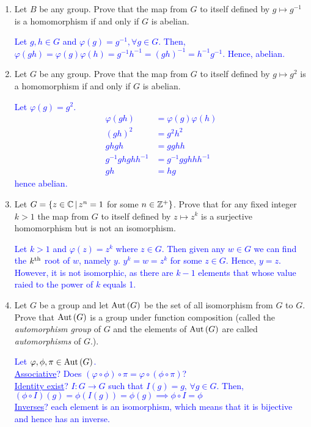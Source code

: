 \documentclass[10pt,a4paper]{report}
\newcommand{\BLUE}[1]{\textcolor{blue}{#1}}
\begin{document}
\begin{enumerate}
	\item Let $B$ be any group.  Prove that the map from $G$ to itself defined by $g \mapsto g^{-1}$ is a homomorphism if and only if $G$ is abelian.
	
	\BLUE{Let $g,h \in G$ and $\varphi(g)= g^{-1}, \forall g \in G$.  Then, $\varphi(gh)=\varphi(g)\varphi(h)=g^{-1}h^{-1}=(gh)^{-1}=h^{-1}g^{-1}$.  Hence, abelian.
	}
	
	\item Let $G$ be any group. Prove that the map from $G$ to itself defined by $g \mapsto g^2$ is a homomorphism if and only if $G$ is abelian.
	
	\BLUE{Let $\varphi(g) = g^2$.  
	\begin{align*}
		\varphi(gh) &= \varphi(g)\varphi(h)\\
		(gh)^2&= g^2h^2 \\
		ghgh &= gghh \\
		g^{-1}ghghh^{-1} &= g^{-1}gghhh^{-1} \\
		gh&=hg
	\end{align*}hence abelian.
	}
	
	\item Let $G = \{z \in \mathbb{C}\, |\,z^n=1$ for some $n \in \mathbb{Z}^+\}$.  Prove that for any fixed integer $k > 1$ the map from $G$ to itself defined by $z \mapsto z^k$ is a surjective homomorphism but is not an isomorphism.
	
	\BLUE{Let $k >1$ and $\varphi(z)=z^k$ where $z \in G$.  Then given any $w \in G$ we can find the $k\textsuperscript{th}$ root of $w$, namely $y$.  $y^k=w=z^k$ for some $z\in G$. Hence, $y=z$. However, it is not isomorphic, as there are $k-1$ elements that whose value raied to the power of $k$ equals 1.
	}
	
	\item Let $G$ be a group and let $\text{Aut}\,(G)$ be the set of all isomorphism from $G$ to $G$.  Prove that $\text{Aut}\,(G)$ is a group under function composition (called the \textit{automorphism group} of $G$ and the elements of $\text{Aut}\,(G)$ are called \textit{automorphisms} of $G$.).
	
	\BLUE{Let $\varphi, \phi, \pi \in \text{Aut}\,(G)$. \\
	\underline{Associative}?  Does $(\varphi \circ \phi) \circ \pi = \varphi \circ (\phi \circ \pi)$?\\
	\underline{Identity exist}?  $I: G \to G$ such that $I(g)=g,\, \forall g \in G$.  Then, $(\phi\circ I)(g)=\phi(I(g))=\phi(g) \implies \phi \circ I = \phi$\\
	\underline{Inverses}? each element is an isomorphism, which means that it is bijective and hence has an inverse.\\
	}
	

\end{enumerate}
\end{document}
